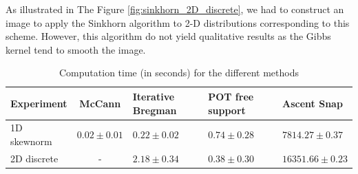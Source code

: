 As illustrated in The Figure \ref{fig:sinkhorn_2D_discrete}, we had to construct an image to apply the Sinkhorn algorithm to 2-D distributions corresponding to this scheme. However, this algorithm do not yield qualitative results as the Gibbs kernel tend to smooth the image.

\begin{table}
    \begin{center}
        \begin{tabularx}{\textwidth}{>{\raggedright}m{2cm} c m{2cm} X X}
                Experiment & McCann & Iterative Bregman & POT free support & Ascent Snap \\
                \hline\hline
                1D skewnorm & $0.02 \pm 0.01$ & $0.22 \pm 0.02$ & $0.74 \pm 0.28$ & $7814.27 \pm 0.37$ \\
                2D discrete & - & $2.18 \pm 0.34$ & $0.38 \pm 0.30$ & $16351.66 \pm 0.23$ \\
        \end{tabularx}
    \end{center}
    \caption{Computation time (in seconds) for the different methods}
    \label{table:time_table}
\end{table}



